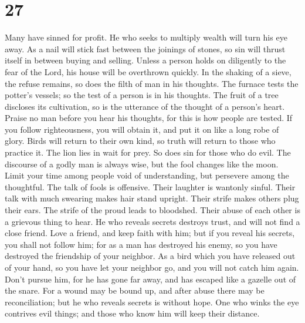 \hypertarget{section-23}{%
\section{27}\label{section-23}}

 Many have sinned for profit. He who seeks to multiply
wealth will turn his eye away.  As a nail will stick fast
between the joinings of stones, so sin will thrust itself in between
buying and selling.  Unless a person holds on diligently
to the fear of the Lord, his house will be overthrown quickly.
 In the shaking of a sieve, the refuse remains, so does
the filth of man in his thoughts.  The furnace tests the
potter's vessels; so the test of a person is in his thoughts.
 The fruit of a tree discloses its cultivation, so is the
utterance of the thought of a person's heart.  Praise no
man before you hear his thoughts, for this is how people are tested.
 If you follow righteousness, you will obtain it, and put
it on like a long robe of glory.  Birds will return to
their own kind, so truth will return to those who practice it.
 The lion lies in wait for prey. So does sin for those
who do evil.  The discourse of a godly man is always
wise, but the fool changes like the moon.  Limit your
time among people void of understanding, but persevere among the
thoughtful.  The talk of fools is offensive. Their
laughter is wantonly sinful.  Their talk with much
swearing makes hair stand upright. Their strife makes others plug their
ears.  The strife of the proud leads to bloodshed. Their
abuse of each other is a grievous thing to hear.  He who
reveals secrets destroys trust, and will not find a close friend.
 Love a friend, and keep faith with him; but if you
reveal his secrets, you shall not follow him;  for as a
man has destroyed his enemy, so you have destroyed the friendship of
your neighbor.  As a bird which you have released out of
your hand, so you have let your neighbor go, and you will not catch him
again.  Don't pursue him, for he has gone far away, and
has escaped like a gazelle out of the snare.  For a wound
may be bound up, and after abuse there may be reconciliation; but he who
reveals secrets is without hope.  One who winks the eye
contrives evil things; and those who know him will keep their distance.

